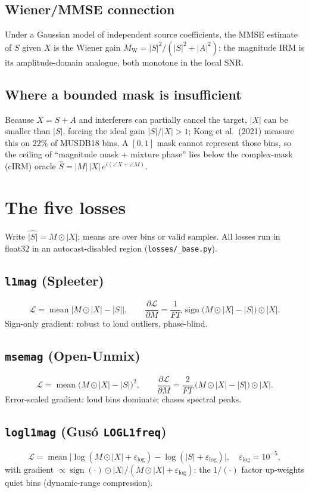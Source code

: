 \documentclass[11pt]{article}
\newcommand{\code}[1]{\texttt{#1}}
\newcommand{\sign}{\operatorname{sign}}
\newcommand{\mean}{\operatorname{mean}}
\begin{document}
\subsection{Wiener/MMSE connection}
Under a Gaussian model of independent source coefficients, the MMSE estimate of
$S$ given $X$ is the Wiener gain $M_{\mathrm W}=|S|^2/(|S|^2+|A|^2)$; the
magnitude IRM is its amplitude-domain analogue, both monotone in the local SNR.

\subsection{Where a bounded mask is insufficient}
Because $X=S+A$ and interferers can partially cancel the target, $|X|$ can be
smaller than $|S|$, forcing the ideal gain $|S|/|X|>1$; Kong et al.\ (2021)
measure this on $22\%$ of MUSDB18 bins. A $[0,1]$ mask cannot represent those
bins, so the ceiling of ``magnitude mask $+$ mixture phase'' lies below the
complex-mask (cIRM) oracle
$\widehat S=|M|\,|X|\,e^{i(\angle X+\angle M)}$.

\section{The five losses}
Write $\widehat{|S|}=M\odot|X|$; means are over bins or valid samples. All losses
run in float32 in an autocast-disabled region (\code{losses/\_base.py}).

\subsection{\code{l1mag} (Spleeter)}
\[
\mathcal L=\mean\bigl|M\odot|X|-|S|\bigr|,\qquad
\frac{\partial\mathcal L}{\partial M}=\frac{1}{FT}\,\sign\!\bigl(M\odot|X|-|S|\bigr)\odot|X|.
\]
Sign-only gradient: robust to loud outliers, phase-blind.

\subsection{\code{msemag} (Open-Unmix)}
\[
\mathcal L=\mean\bigl(M\odot|X|-|S|\bigr)^2,\qquad
\frac{\partial\mathcal L}{\partial M}=\frac{2}{FT}\,\bigl(M\odot|X|-|S|\bigr)\odot|X|.
\]
Error-scaled gradient: loud bins dominate; chases spectral peaks.

\subsection{\code{logl1mag} (Gus\'o \code{LOGL1freq})}
\[
\mathcal L=\mean\bigl|\log(M\odot|X|+\varepsilon_{\log})-\log(|S|+\varepsilon_{\log})\bigr|,
\quad\varepsilon_{\log}=10^{-5},
\]
with gradient $\propto\sign(\cdot)\odot|X|/(M\odot|X|+\varepsilon_{\log})$: the
$1/(\cdot)$ factor up-weights quiet bins (dynamic-range compression).
\end{document}
